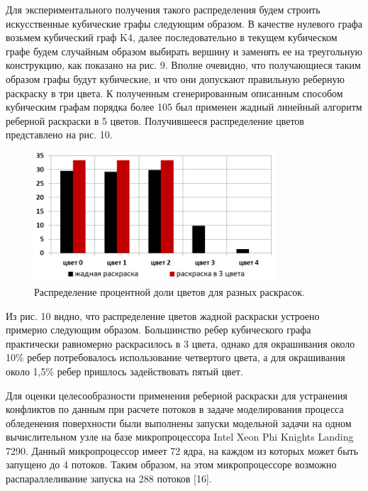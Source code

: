 Для экспериментального получения такого распределения будем строить искусственные кубические графы следующим образом.
В качестве нулевого графа возьмем кубический граф K4, далее последовательно в текущем кубическом графе будем случайным образом выбирать вершину и заменять ее на треугольную конструкцию, как показано на рис. 9.
Вполне очевидно, что получающиеся таким образом графы будут кубические, и что они допускают правильную реберную раскраску в три цвета.
К полученным сгенерированным описанным способом кубическим графам порядка более 105 был применен жадный линейный алгоритм реберной раскраски в 5 цветов.
Получившееся распределение цветов представлено на рис. 10.

\begin{figure}[ht]
	\centering
		\includegraphics[width=0.8\textwidth]{./pics/text_3_edge_coloring/10-chart.png}
	\caption{Распределение процентной доли цветов для разных раскрасок.}
	\label{fig:text_3_edge_coloring_10}
\end{figure}

Из рис. 10 видно, что распределение цветов жадной раскраски устроено примерно следующим образом. Большинство ребер кубического графа практически равномерно раскрасилось в 3 цвета, однако для окрашивания около 10\% ребер потребовалось использование четвертого цвета, а для окрашивания около 1,5\% ребер пришлось задействовать пятый цвет.

Для оценки целесообразности применения реберной раскраски для устранения конфликтов по данным при расчете потоков в задаче моделирования процесса обледенения поверхности были выполнены запуски модельной задачи на одном вычислительном узле на базе микропроцессора Intel Xeon Phi Knights Landing 7290.
Данный микропроцессор имеет 72 ядра, на каждом из которых может быть запущено до 4 потоков.
Таким образом, на этом микропроцессоре возможно распараллеливание запуска на 288 потоков [16].


